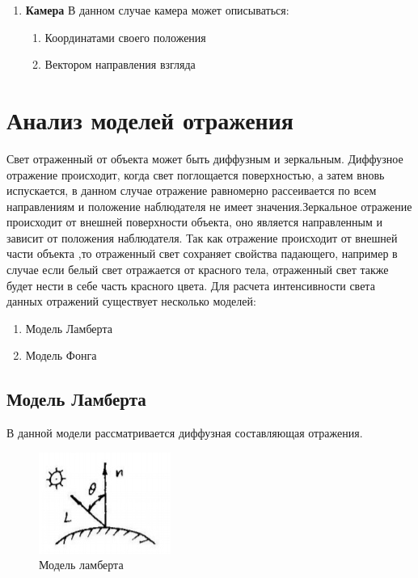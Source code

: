 \documentclass[a4paper,14pt, unknownkeysallowed]{extreport}
\begin{document}
\begin{enumerate}
	\item \textbf{Камера}
	В данном случае камера может описываться:
	\begin{enumerate}
		\item Координатами своего положения
		\item Вектором направления взгляда
	\end{enumerate}
	
\end{enumerate}

\section[Анализ моделей отражения]{Анализ моделей отражения}
\label{sec:reflection_models}
Свет отраженный от объекта может быть диффузным и зеркальным.
Диффузное отражение происходит, когда свет поглощается поверхностью, а затем вновь испускается, в данном случае
отражение равномерно рассеивается по всем направлениям и положение наблюдателя не имеет значения.Зеркальное отражение
происходит от внешней поверхности объекта, оно является направленным и зависит от положения наблюдателя.
Так как отражение происходит от внешней части объекта ,то отраженный свет сохраняет свойства падающего, например в случае если белый свет отражается
от красного тела, отраженный свет также будет нести в себе часть красного цвета.
Для расчета интенсивности света данных отражений существует несколько моделей:\cite{Rodgers}
\begin{enumerate}
	\item Модель Ламберта
	\item Модель Фонга
\end{enumerate}

\subsection{Модель Ламберта}
В данной модели рассматривается диффузная составляющая отражения.

\begin{figure}[h]
	\centering
	\includegraphics{lambert_model}
	\caption{Модель ламберта}
	\label{fig:lambert_model}
\end{figure}
\end{document}
